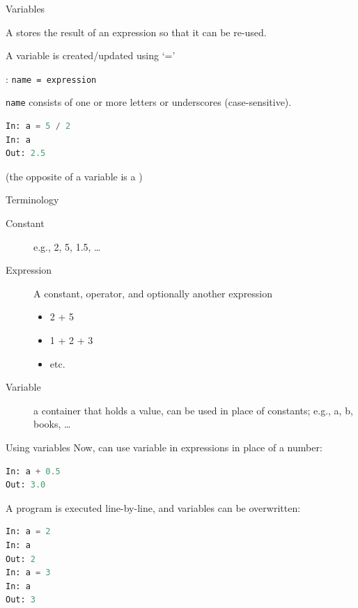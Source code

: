 \documentclass[aspectratio=169,usenames,dvipsnames]{beamer}
\begin{document}
\begin{frame}[fragile]{Variables}
    \begin{definition}
        A  stores the result of an expression
        so that it can be re-used.
    \end{definition}

A variable is created/updated using `='

\begin{definition}
: \texttt{name = expression}

\texttt{name} consists of one or more letters or underscores (case-sensitive).
\end{definition}

\begin{lstlisting}[language=python]
In: a = 5 / 2
In: a
Out: 2.5
\end{lstlisting}

(the opposite of a variable is a )
\end{frame}

\begin{frame}{Terminology}
    \begin{description}
        \item[Constant]
            e.g., 2, 5, 1.5, \dots
        \item[Expression]
            A constant, operator, and optionally another expression
            \begin{itemize}
                \item 2 + 5
                \item 1 + 2 + 3
                \item etc.
            \end{itemize}
        \item[Variable] a container that holds a value,
            can be used in place of constants;
            e.g., a, b, books, \dots
    \end{description}
\end{frame}

\begin{frame}[fragile]{Using variables}
Now, can use variable in expressions in place of a number:

\begin{lstlisting}[language=python]
In: a + 0.5
Out: 3.0
\end{lstlisting}

\pause
A program is executed line-by-line, and variables can be overwritten:
\begin{lstlisting}[language=python]
In: a = 2
In: a
Out: 2
In: a = 3
In: a
Out: 3
\end{lstlisting}
\end{frame}
\end{document}
